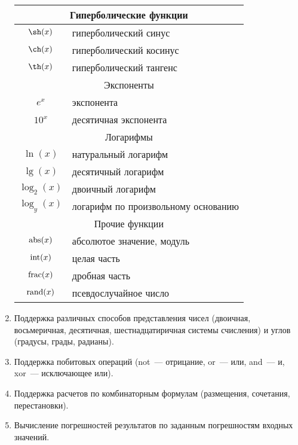 \begin{enumerate}
\begin{table}
\begin{tabular}{|c|l|}
 \multicolumn{2}{|c|}{Гиперболические функции}
 \\ \hline
 $\sh(x)$ & гиперболический синус
 \\ \hline
 $\ch(x)$ & гиперболический косинус
 \\ \hline
 $\th(x)$ & гиперболический тангенс
 \\ \hline
 
 \multicolumn{2}{|c|}{Экспоненты}
 \\ \hline
 $e^x$  & экспонента
 \\ \hline
 $10^x$ & десятичная экспонента
 \\ \hline
       
 \multicolumn{2}{|c|}{Логарифмы}  
 \\ \hline
 $\ln(x)$    & натуральный логарифм
 \\ \hline
 $\lg(x)$    & десятичный логарифм
 \\ \hline
 $\log_2(x)$ & двоичный логарифм
 \\ \hline
 $\log_y(x)$ & логарифм по произвольному основанию
 \\ \hline
      
 \multicolumn{2}{|c|}{Прочие функции} 
 \\ \hline  
 $\operatorname{abs}(x)$  & абсолютое значение, модуль
 \\ \hline
 $\operatorname{int}(x)$  & целая часть
 \\ \hline
 $\operatorname{frac}(x)$ & дробная часть
 \\ \hline
 $\operatorname{rand}(x)$ & псевдослучайное число
 \\ \hline
\end{tabular}
\end{table}

  \item Поддержка различных способов представления чисел (двоичная,
        восьмеричная, десятичная, шестнадцатиричная системы счисления)
        и углов (градусы, грады, радианы).

  \item Поддержка побитовых операций (not~--- отрицание, 
        or~--- или, and~--- и, xor~--- исключающее или).

  \item Поддержка расчетов по комбинаторным формулам (размещения, сочетания,
        перестановки).

  \item Вычисление погрешностей результатов по заданным погрешностям входных
        значений.
\end{enumerate}

